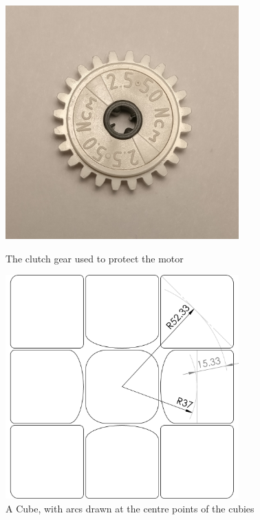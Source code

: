 \documentclass{report}
\begin{document}
	\begin{figure}
		\centering
		\begin{minipage}{0.4\textwidth}
			\centering
			\includegraphics[width=0.8\textwidth]{Resources/Images/imgClutchGear.jpg}
			\caption{The clutch gear used to protect the motor}
			\label{fig:imgClutchGear}
		\end{minipage}%
		\hspace{10mm}
		\begin{minipage}{0.4\textwidth}
			\centering
			\includegraphics[width=0.8\textwidth]{Resources/Images/dwgCubeProfileCentreArcs.png}
			\caption{A Cube, with arcs drawn at the centre points of the cubies}
			\label{fig:dwgCubeProfileCentreArcs}
		\end{minipage}
	\end{figure}
	
\end{document}
